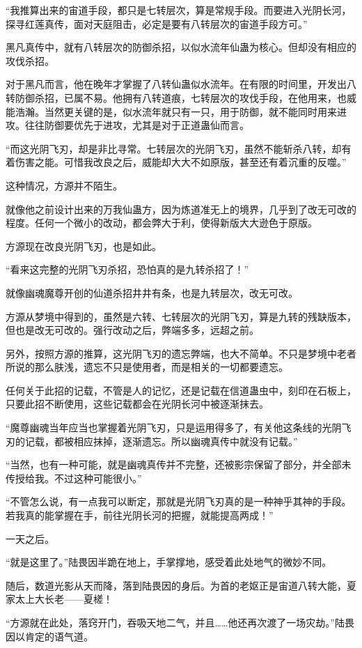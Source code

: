 \begin{this_body}
“我推算出来的宙道手段，都只是七转层次，算是常规手段。而要进入光阴长河，探寻红莲真传，面对天庭阻击，必定是要有八转层次的宙道手段方可。”

黑凡真传中，就有八转层次的防御杀招，以似水流年仙蛊为核心。但却没有相应的攻伐杀招。

对于黑凡而言，他在晚年才掌握了八转仙蛊似水流年。在有限的时间里，开发出八转防御杀招，已属不易。他拥有八转道痕，七转层次的攻伐手段，在他用来，也威能浩瀚。当然更关键的是，似水流年就只有一只，用于防御，就不能同时用来进攻。往往防御要优先于进攻，尤其是对于正道蛊仙而言。

“而这光阴飞刃，却是非比寻常。七转层次的光阴飞刃，虽然不能斩杀八转，却有着伤害之能。可惜我改良之后，威能却大大不如原版，甚至还有着沉重的反噬。”

这种情况，方源并不陌生。

就像他之前设计出来的万我仙蛊方，因为炼道准无上的境界，几乎到了改无可改的程度。任何一个微小的改动，都会弊大于利，使得新版大大逊色于原版。

方源现在改良光阴飞刃，也是如此。

“看来这完整的光阴飞刃杀招，恐怕真的是九转杀招了！”

就像幽魂魔尊开创的仙道杀招井井有条，也是九转层次，改无可改。

方源从梦境中得到的，虽然是六转、七转层次的光阴飞刃，算是九转的残缺版本，但也是改无可改的。强行改动之后，弊端多多，远超之前。

另外，按照方源的推算，这光阴飞刃的遗忘弊端，也大不简单。不只是梦境中老者所说的那么肤浅，遗忘不只是使用者，而是相关的一切都要遗忘。

任何关于此招的记载，不管是人的记忆，还是记载在信道蛊虫中，刻印在石板上，只要此招不断使用，这些记载都会在光阴长河中被逐渐抹去。

“魔尊幽魂当年应当也掌握着光阴飞刃，只是运用得多了，有关他这条线的光阴飞刃的记载，都被相应抹掉，逐渐遗忘。所以幽魂真传中就没有记载。”

“当然，也有一种可能，就是幽魂真传并不完整，还被影宗保留了部分，并全部未传授给我。不过这种可能很小。”

“不管怎么说，有一点我可以断定，那就是光阴飞刃真的是一种神乎其神的手段。若我真的能掌握在手，前往光阴长河的把握，就能提高两成！”

一天之后。

“就是这里了。”陆畏因半跪在地上，手掌撑地，感受着此处地气的微妙不同。

随后，数道光影从天而降，落到陆畏因的身后。为首的老妪正是宙道八转大能，夏家太上大长老——夏槎！

“方源就在此处，落窍开门，吞吸天地二气，并且……他还再次渡了一场灾劫。”陆畏因以肯定的语气道。


\end{this_body}
